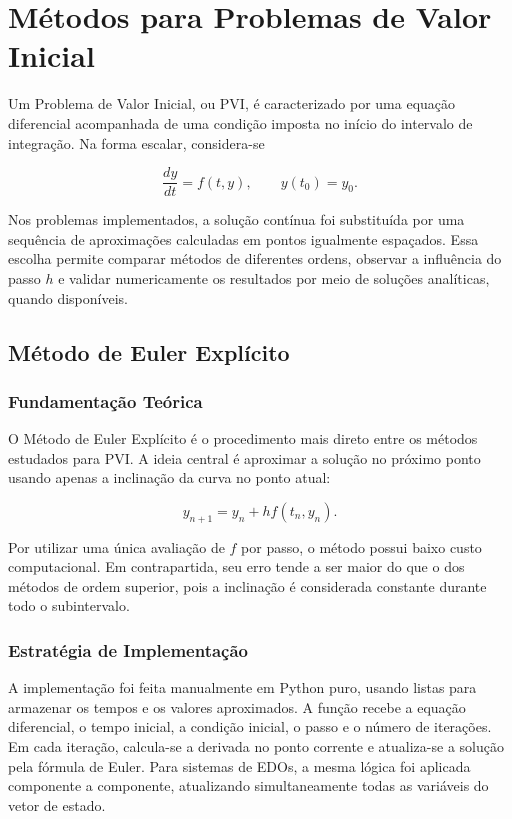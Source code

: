 \section{Métodos para Problemas de Valor Inicial}

Um Problema de Valor Inicial, ou PVI, é caracterizado por uma equação diferencial acompanhada de uma condição imposta no início do intervalo de integração. Na forma escalar, considera-se

\[
    \frac{dy}{dt}=f(t,y), \qquad y(t_0)=y_0.
\]

Nos problemas implementados, a solução contínua foi substituída por uma sequência de aproximações calculadas em pontos igualmente espaçados. Essa escolha permite comparar métodos de diferentes ordens, observar a influência do passo \(h\) e validar numericamente os resultados por meio de soluções analíticas, quando disponíveis.

\subsection{Método de Euler Explícito}

\subsubsection{Fundamentação Teórica}

O Método de Euler Explícito é o procedimento mais direto entre os métodos estudados para PVI. A ideia central é aproximar a solução no próximo ponto usando apenas a inclinação da curva no ponto atual:

\[
    y_{n+1}=y_n+h f(t_n,y_n).
\]

Por utilizar uma única avaliação de \(f\) por passo, o método possui baixo custo computacional. Em contrapartida, seu erro tende a ser maior do que o dos métodos de ordem superior, pois a inclinação é considerada constante durante todo o subintervalo.

\subsubsection{Estratégia de Implementação}

A implementação foi feita manualmente em Python puro, usando listas para armazenar os tempos e os valores aproximados. A função recebe a equação diferencial, o tempo inicial, a condição inicial, o passo e o número de iterações. Em cada iteração, calcula-se a derivada no ponto corrente e atualiza-se a solução pela fórmula de Euler. Para sistemas de EDOs, a mesma lógica foi aplicada componente a componente, atualizando simultaneamente todas as variáveis do vetor de estado.

